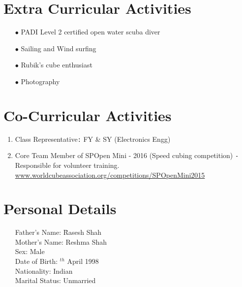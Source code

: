 \documentclass{article}
\begin{document}
	\section*{Extra Curricular Activities}
	\begin{itemize}
		\item[$\bullet$] PADI Level 2 certified open water scuba diver
		\item[$\bullet$] Sailing and Wind surfing
		\item[$\bullet$] Rubik’s cube enthusiast 
		\item[$\bullet$] Photography 
	\end{itemize}
	
	\section*{Co-Curricular Activities}
	\begin{enumerate}
		\item Class Representative\verb|:| FY \& SY (Electronics Engg) 
		\item Core Team Member of SPOpen Mini - 2016 (Speed cubing competition) \verb|-|Responsible for volunteer training.\\
		\url{www.worldcubeassociation.org/competitions/SPOpenMini2015}
	\end{enumerate}
	
	\section*{Personal Details}
	\begin{itemize}
		\item[]
		\begin{tabbing}
			Father's Name: \=Rasesh Shah\\ 
			Mother's Name: \>Reshma Shah\\ 
			Sex: \>Male\\ 
			Date of Birth: $^{th}$ April 1998\\ 
			Nationality: \>Indian\\ 
			Marital Status: \>Unmarried
		\end{tabbing}
	\end{itemize}
	
\end{document}
